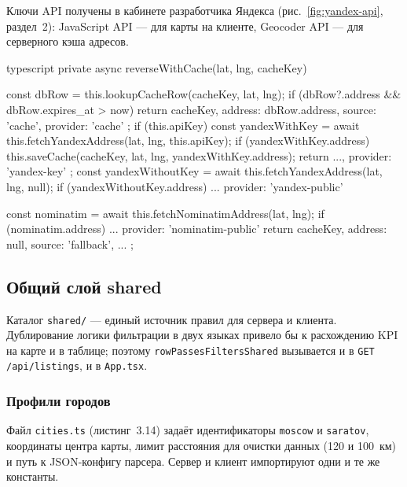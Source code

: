 Ключи API получены в кабинете разработчика Яндекса (рис.~\ref{fig:yandex-api}, раздел~2): JavaScript API --- для карты на клиенте, Geocoder API --- для серверного кэша адресов.

\begin{singleminted}{typescript}
private async reverseWithCache(lat, lng, cacheKey) {
    const dbRow = this.lookupCacheRow(cacheKey, lat, lng);
    if (dbRow?.address && dbRow.expires_at > now) {
        return { cacheKey, address: dbRow.address, source: 'cache', provider: 'cache' };
    }
    if (this.apiKey) {
        const yandexWithKey = await this.fetchYandexAddress(lat, lng, this.apiKey);
        if (yandexWithKey.address) {
            this.saveCache(cacheKey, lat, lng, yandexWithKey.address);
            return { ..., provider: 'yandex-key' };
        }
    }
    const yandexWithoutKey = await this.fetchYandexAddress(lat, lng, null);
    if (yandexWithoutKey.address) { ... provider: 'yandex-public' }

    const nominatim = await this.fetchNominatimAddress(lat, lng);
    if (nominatim.address) { ... provider: 'nominatim-public' }
    return { cacheKey, address: null, source: 'fallback', ... };
}
\end{singleminted}
\label{lst:reverse-geocode}

\subsection{Общий слой shared}

Каталог \texttt{shared/} --- единый источник правил для сервера и клиента. Дублирование логики фильтрации в двух языках привело бы к расхождению KPI на карте и в таблице; поэтому \texttt{rowPassesFiltersShared} вызывается и в \texttt{GET /api/listings}, и в \texttt{App.tsx}.

\subsubsection{Профили городов}

Файл \texttt{cities.ts} (листинг~3.14) задаёт идентификаторы \texttt{moscow} и \texttt{saratov}, координаты центра карты, лимит расстояния для очистки данных (120 и 100~км) и путь к JSON-конфигу парсера. Сервер и клиент импортируют одни и те же константы.

